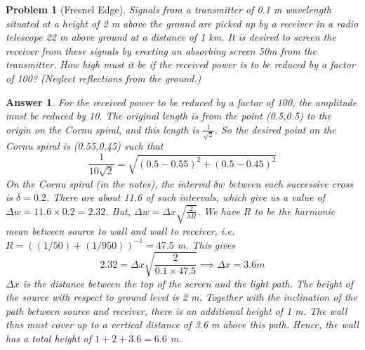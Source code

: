 \documentclass[a4paper]{article}
\newtheorem{ans}{Answer}[section]
\theoremstyle{new}
\newtheorem{qns}{Problem}[section]
\begin{document}
\newpage
\begin{qns}[Fresnel Edge]
Signals from a transmitter of 0.1 m wavelength situated at a height of 2 m above the ground are picked up by a receiver in a radio telescope 22 m above ground at a distance of 1 km. It is desired to screen the receiver from these signals by erecting an absorbing screen 50m from the transmitter. How high must it be if the received power is to be reduced by a factor of 100? (Neglect reflections from the ground.)
\end{qns}
\begin{ans}
For the received power to be reduced by a factor of 100, the amplitude must be reduced by 10. The original length is from the point (0.5,0.5) to the origin on the Cornu spiral, and this length is $\frac{1}{\sqrt{2}}$. So the desired point on the Cornu spiral is (0.55,0.45) such that
$$\frac{1}{10\sqrt{2}}=\sqrt{(0.5-0.55)^2+(0.5-0.45)^2}$$
On the Cornu spiral (in the notes), the interval $\delta w$ between each successive cross is $\delta=0.2$. There are about 11.6 of such intervals, which give us a value of $\Delta w=11.6\times 0.2=2.32$. But, $\Delta w=\Delta x\sqrt{\frac{2}{\lambda R}}$. We have $R$ to be the harmonic mean between source to wall and wall to receiver, i.e. $R=((1/50)+(1/950))^{-1}=47.5$ m. This gives $$2.32=\Delta x\sqrt{\frac{2}{0.1\times 47.5}}\implies \Delta x=3.6 m$$
$\Delta  x$ is the distance between the top of the screen and the light path. The height of the source with respect to ground level is 2 m. Together with the inclination of the path between source and receiver, there is an additional height of 1 m. The wall thus must cover up to a vertical distance of 3.6 m above this path. Hence, the wall has a total height of $1+2+3.6=6.6$ m.
\end{ans}
\end{document}
